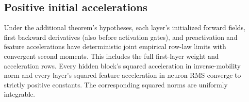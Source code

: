 \subsection{Positive initial accelerations}

\begin{lemma}
\label{fl:initial-activity}
Under the additional theorem's hypotheses, each layer's initialized forward
fields, first backward derivatives (also before activation gates), and
preactivation and feature accelerations have deterministic joint empirical
row-law limits with convergent second moments. This includes the full
first-layer weight and acceleration rows. Every hidden block's squared
acceleration in inverse-mobility norm and every layer's squared feature
acceleration in neuron RMS converge to strictly positive constants.
The corresponding squared norms are uniformly integrable.
\end{lemma}


